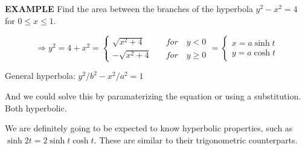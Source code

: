 \documentclass{article}
\begin{document}
{\bf{}EXAMPLE} Find the area between the branches of the hyperbola $y^2-x^2=4$ for $0\leq x\leq1$.

\[\Rightarrow y^2=4+x^2=\left\{\begin{aligned}\sqrt{x^2+4}&\quad for\quad y<0\\-\sqrt{x^2+4}&\quad for\quad y\geq0\end{aligned}\right.=\left\{\begin{aligned}x=a\sinh t\\y=a\cosh t\end{aligned}\right.\]

General hyperbola: $y^2/b^2-x^2/a^2=1$

\begin{center}
\end{center}


And we could solve this by paramaterizing the equation or using a substitution. Both hyperbolic.

\vspace{10pt}

We are definitely going to be expected to know hyperbolic properties, such as $\sinh2t=2\sinh t\cosh t$. These are similar to their trigonometric counterparts.
\end{document}
